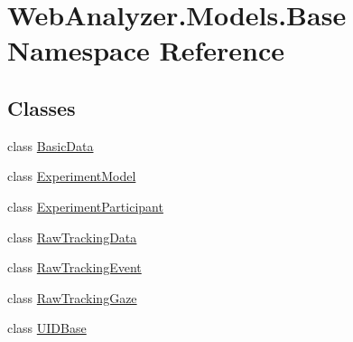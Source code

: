 \hypertarget{namespace_web_analyzer_1_1_models_1_1_base}{}\section{Web\+Analyzer.\+Models.\+Base Namespace Reference}
\label{namespace_web_analyzer_1_1_models_1_1_base}
\subsection*{Classes}
\begin{DoxyCompactItemize}
\item 
class \hyperlink{class_web_analyzer_1_1_models_1_1_base_1_1_basic_data}{Basic\+Data}
\item 
class \hyperlink{class_web_analyzer_1_1_models_1_1_base_1_1_experiment_model}{Experiment\+Model}
\item 
class \hyperlink{class_web_analyzer_1_1_models_1_1_base_1_1_experiment_participant}{Experiment\+Participant}
\item 
class \hyperlink{class_web_analyzer_1_1_models_1_1_base_1_1_raw_tracking_data}{Raw\+Tracking\+Data}
\item 
class \hyperlink{class_web_analyzer_1_1_models_1_1_base_1_1_raw_tracking_event}{Raw\+Tracking\+Event}
\item 
class \hyperlink{class_web_analyzer_1_1_models_1_1_base_1_1_raw_tracking_gaze}{Raw\+Tracking\+Gaze}
\item 
class \hyperlink{class_web_analyzer_1_1_models_1_1_base_1_1_u_i_d_base}{U\+I\+D\+Base}
\end{DoxyCompactItemize}
